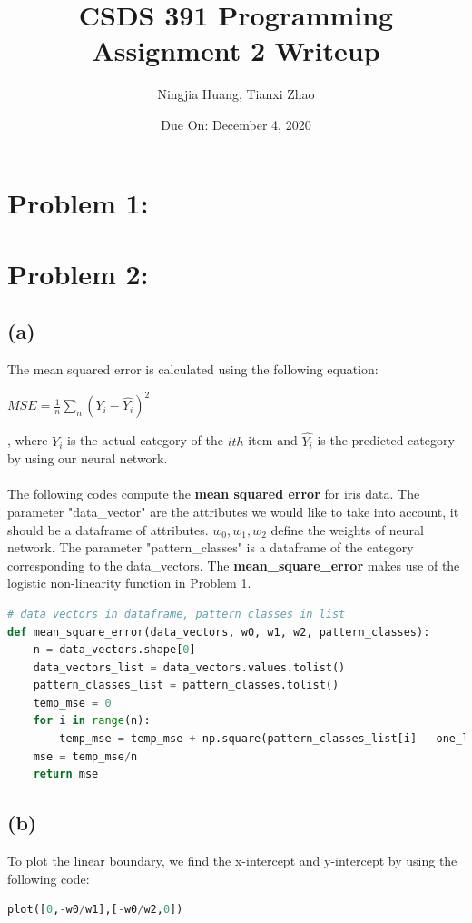 \documentclass[12pt]{article}
\begin{document}
\title{CSDS 391 Programming Assignment 2 Writeup}
\author{Ningjia Huang, Tianxi Zhao}
\date{Due On: December 4, 2020}
\maketitle

\section*{Problem 1: }

\section*{Problem 2: }
\subsection*{(a)}
The mean squared error is calculated using the following equation: 
\begin{center}
    $MSE = \frac{1}{n}\sum_n (Y_i - \hat{Y_i})^2$
\end{center}
, where $Y_i$ is the actual category of the $ith$ item and $\hat{Y_i}$ is the predicted category by using our neural network.\\ \\
The following codes compute the \textbf{mean squared error} for iris data. The parameter "data\_vector" are the attributes we would like to take into account, it should be a dataframe of attributes.
$w_0, w_1, w_2$ define the weights of neural network. The parameter "pattern\_classes" is a dataframe of the category corresponding to the data\_vectors. The \textbf{mean\_square\_error} makes use of 
the logistic non-linearity function in Problem 1.
\begin{lstlisting}[language=Python, caption=Mean Squared Error Calculation]
# data vectors in dataframe, pattern classes in list
def mean_square_error(data_vectors, w0, w1, w2, pattern_classes):
    n = data_vectors.shape[0]
    data_vectors_list = data_vectors.values.tolist()
    pattern_classes_list = pattern_classes.tolist()
    temp_mse = 0
    for i in range(n):
        temp_mse = temp_mse + np.square(pattern_classes_list[i] - one_layer_network(w0, w1, w2, data_vectors_list[i][0], data_vectors_list[i][1]))
    mse = temp_mse/n
    return mse
\end{lstlisting}

\subsection*{(b)}
To plot the linear boundary, we find the x-intercept and y-intercept by using the following code: 
\begin{lstlisting}[language=Python, caption=Plot Mean Squared Error]
plot([0,-w0/w1],[-w0/w2,0])
\end{lstlisting}
\end{document}
